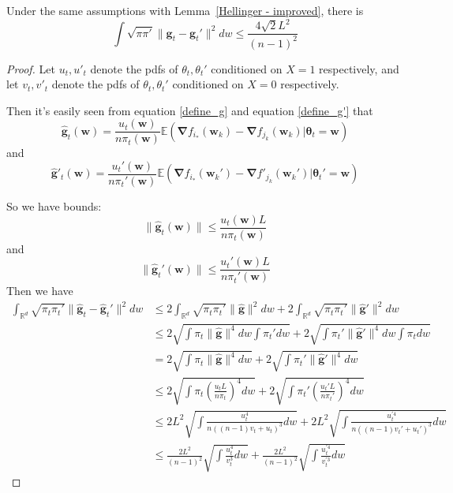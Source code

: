 \documentclass[final,12pt]{colt2018} %
\begin{document}
\begin{lemma}
\label{upper bound of average gradient}
  Under the same assumptions with Lemma~\ref{Hellinger - improved}, there is 
  \begin{equation}
    \int \sqrt{\pi \pi'}\|\bm{g}_t-\bm{g}_t'\|^2dw\le \frac{4\sqrt{2}L^2}{(n-1)^2}
  \end{equation}
\end{lemma}
\begin{proof}
  Let $u_t,u'_t$ denote the pdfs of $\theta_t, \theta_t'$ conditioned on $X=1$ respectively, and let $v_t,v'_t$ denote the pdfs of $\theta_t, \theta_t'$ conditioned on $X=0$ respectively.

Then it's easily seen from equation \ref{define_g} and equation \ref{define_g'} that
\begin{equation}
  \hat{\bm{g}}_t(\bm{w})= \frac{u_t(\bm{w})}{n\pi_t(\bm{w})} \mathbb{E}(\bm{\nabla}f_{i_*}(\bm{w}_k)-\bm{\nabla}f_{j_k}(\bm{w}_k)|\bm{\theta}_t=\bm{w})
\end{equation}
and
\begin{equation}
  \hat{\bm{g}}'_t(\bm{w})= \frac{u_t'(\bm{w})}{n\pi_t'(\bm{w})} \mathbb{E}(\bm{\nabla}f_{i_*}(\bm{w}_k')-\bm{\nabla}f'_{j_k}(\bm{w}_k')|\bm{\theta}_t'=\bm{w})
\end{equation}


So we have bounds:
\begin{equation}
  \|\hat{\bm{g}}_t(\bm{w})\|\le \frac{u_t(\bm{w})L}{n\pi_t(\bm{w})}
\end{equation}
and
\begin{equation}
  \|\hat{\bm{g}}_t'(\bm{w})\|\le \frac{u_t'(\bm{w})L}{n\pi_t'(\bm{w})}
\end{equation}
Then we have
\begin{align*}
\int_{\mathbb{R}^d} \sqrt{\pi_t \pi_t'}\|\hat{\bm{g}}_t-\hat{\bm{g}}_t'\|^2dw&\le 2\int_ {\mathbb{R}^d}\sqrt{\pi_t \pi_t'}\|\hat{\bm{g}}\|^2dw +2\int_{\mathbb{R}^d}\sqrt{\pi_t\pi_t'}\|\hat{\bm{g}}'\|^2dw\\
&\le 2\sqrt{\int \pi_t\|\hat{\bm{g}}\|^4dw\int \pi_t'dw}+2\sqrt{\int \pi_t'\|\hat{\bm{g}}'\|^4dw\int \pi_tdw}\\
&=2\sqrt{\int \pi_t\|\hat{\bm{g}}\|^4dw}+2\sqrt{\int \pi_t'\|\hat{\bm{g}}'\|^4dw}\\
&\le2\sqrt{\int \pi_t\left(\frac{u_tL}{n \pi_t}\right)^4dw}+2\sqrt{\int \pi_t'\left(\frac{u_t'L}{n \pi_t'}\right)^4dw}\\
&\le2L^2\sqrt{\int \frac{u_t^4}{n((n-1)v_t+ u_t)^3}dw}+2L^2\sqrt{\int \frac{u_t^{\prime 4}}{n((n-1)v_t'+u_t')^3}dw}\\
&\le \frac{2L^2}{(n-1)^2}\sqrt{\int \frac{u_t^4}{v_t^3}dw}+ \frac{2L^2}{(n-1)^2}\sqrt{\int \frac{u_t^{\prime 4}}{v_t^{\prime 3}}dw}
\end{align*}


\end{proof}
\end{document}
